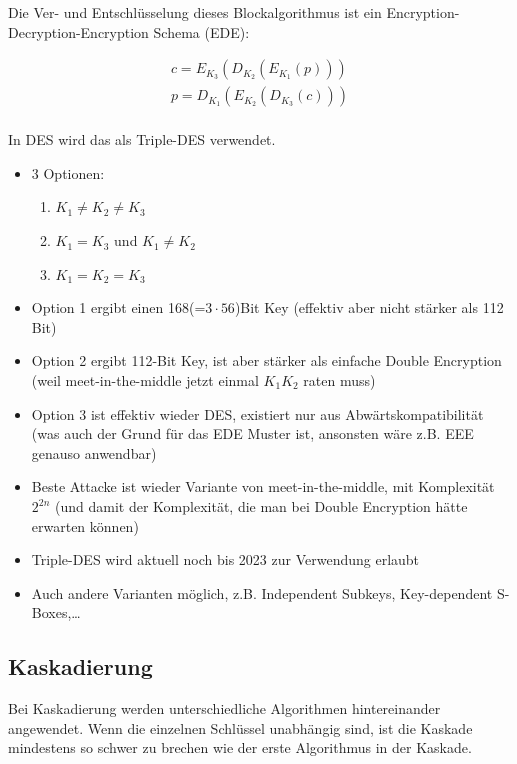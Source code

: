 Die Ver- und Entschlüsselung dieses Blockalgorithmus ist ein Encryption-Decryption-Encryption Schema (EDE):

\begin{align*}
    c = E_{K_3}\left( D_{K_2} \left( E_{K_1}(p) \right) \right) \\
    p = D_{K_1}\left( E_{K_2} \left( D_{K_3}(c) \right) \right) \\
\end{align*}

In DES wird das als Triple-DES verwendet.

\begin{itemize}
    \item 3 Optionen:
    \begin{enumerate}
        \item $K_1 \neq K_2 \neq K_3$
        \item $K_1 = K_3$ und $K_1 \neq K_2$
        \item $K_1 = K_2 = K_3$
    \end{enumerate}
    \item Option 1 ergibt einen 168(=$3\cdot 56$)Bit Key (effektiv aber nicht stärker als 112 Bit)
    \item Option 2 ergibt 112-Bit Key, ist aber stärker als einfache Double Encryption (weil meet-in-the-middle jetzt einmal $K_1K_2$ raten muss)
    \item Option 3 ist effektiv wieder DES, existiert nur aus Abwärtskompatibilität (was auch der Grund für das EDE Muster ist, ansonsten wäre z.B. EEE genauso anwendbar)
    \item Beste Attacke ist wieder Variante von meet-in-the-middle, mit Komplexität $2^{2n}$ 
    (und damit der Komplexität, die man bei Double Encryption hätte erwarten 
    können)
    \item Triple-DES wird aktuell noch bis 2023 zur Verwendung erlaubt
    \item Auch andere Varianten möglich, z.B. Independent Subkeys, Key-dependent S-Boxes,\ldots
\end{itemize}

\subsection{Kaskadierung}

Bei Kaskadierung werden unterschiedliche Algorithmen hintereinander angewendet. Wenn die einzelnen Schlüssel unabhängig sind, ist die Kaskade mindestens so schwer zu 
brechen wie der erste Algorithmus in der Kaskade.

